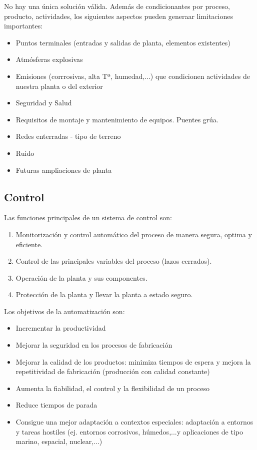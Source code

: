 No hay una única solución válida. Además de condicionantes por proceso, producto, actividades, los siguientes aspectos pueden generaar limitaciones importantes:
\begin{itemize}
    \item Puntos terminales (entradas y salidas de planta, elementos existentes)
    \item Atmósferas explosivas
    \item Emisiones (corrrosivas, alta Tª, humedad,...) que condicionen actividades de nuestra planta o del exterior
    \item Seguridad y Salud
    \item Requisitos de montaje y mantenimiento de equipos. Puentes grúa.
    \item Redes enterradas - tipo de terreno
    \item Ruido
    \item Futuras ampliaciones de planta
\end{itemize}

\subsection*{Control}

Las funciones principales de un sistema de control son:
\begin{enumerate}
    \item Monitorización y control automático del proceso de manera segura, optima y eficiente.
    \item Control de las principales variables del proceso (lazos cerrados).
    \item Operación de la planta y sus componentes.
    \item Protección de la planta y llevar la planta a estado seguro.
\end{enumerate}

Los objetivos de la automatización son:
\begin{itemize}
    \item Incrementar la productividad
    \item Mejorar la seguridad en los procesos de fabricación
    \item Mejorar la calidad de los productos: minimiza tiempos de espera y mejora la repetitividad de fabricación (producción con calidad constante)
    \item Aumenta la fiabilidad, el control y la flexibilidad de un proceso
    \item Reduce tiempos de parada
    \item Consigue una mejor adaptación a contextos especiales: adaptación a entornos y tareas hostiles (ej. entornos corrosivos, húmedos,...y aplicaciones de tipo marino, espacial, nuclear,...)
\end{itemize}

